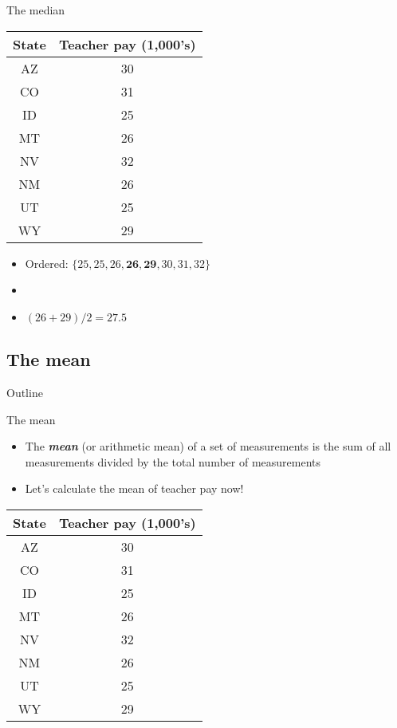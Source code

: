 \documentclass[xcolor=dvipsnames]{beamer}
\begin{document}
\begin{frame}{The median}
		\begin{center}
		\begin{tabular}{|c|c|}
			\hline 
			\textbf{State} & \textbf{Teacher pay (1,000's)} \\ 
			\hline \hline
			AZ & 30 \\ \hline 
			CO &  31 \\ \hline 
			ID & 25  \\  \hline 
			MT &  26 \\ \hline 
			NV & 32 \\ \hline 
			NM &  26 \\ \hline 
			UT &  25 \\ \hline 
			WY &  29 \\ \hline 
		\end{tabular} 
	\end{center}
	\begin{itemize}
		\item Ordered: 	$\{25, 25, 26, \textbf{26}, \textbf{29}, 30, 31, 32\} $
		\item[]
		\item $(26+29)/2 = 27.5$
	\end{itemize}
\end{frame}

\subsection{The mean}
\begin{frame}{Outline}
	\tableofcontents[currentsection,subsectionstyle=show/shaded/hide]
\end{frame}

\begin{frame}{The mean}
	\begin{itemize}
		\item The \emph{\textbf{mean}} (or arithmetic mean) of a set of measurements is the sum of all measurements divided by the total number of measurements \pause
		\item Let's calculate the mean of teacher pay now!
	\end{itemize}
		\begin{center}
			\begin{tabular}{|c|c|}
				\hline 
				\textbf{State} & \textbf{Teacher pay (1,000's)} \\ 
				\hline \hline
				AZ & 30 \\ \hline 
				CO &  31 \\ \hline 
				ID & 25  \\  \hline 
				MT &  26 \\ \hline 
				NV & 32 \\ \hline 
				NM &  26 \\ \hline 
				UT &  25 \\ \hline 
				WY &  29 \\ \hline 
			\end{tabular} 
		\end{center}
\end{frame}
\end{document}
